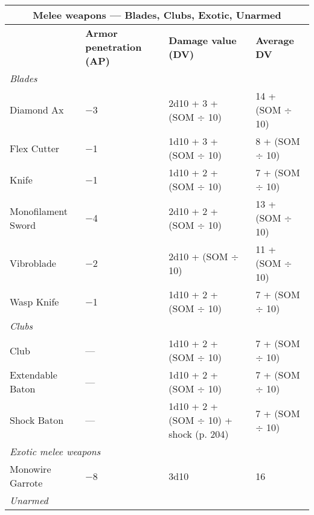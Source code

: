 \begin{table} \begin{tabularx}{\textwidth}{|l|X|l|l|} \hline

\multicolumn{4}{|c|}{\textbf{Melee weapons --- Blades, Clubs, Exotic, Unarmed}} \\ \hline

&\textbf{Armor penetration (AP)}	&\textbf{Damage value (DV)}	&\textbf{Average DV} \\ \hline

\multicolumn{4}{|l|}{\emph{Blades}} \\ \hline

Diamond Ax	&$-$3	&2d10 + 3 + (SOM $\div$ 10)	&14 + (SOM $\div$ 10) \\ \hline

Flex Cutter	&$-$1	&1d10 + 3 + (SOM $\div$ 10)	&8 + (SOM $\div$ 10) \\ \hline

Knife	&$-$1	&1d10 + 2 + (SOM $\div$ 10)	&7 + (SOM $\div$ 10) \\ \hline

Monofilament Sword	&$-$4	&2d10 + 2 + (SOM $\div$ 10)	&13 + (SOM $\div$ 10) \\ \hline

Vibroblade	&$-$2	&2d10 + (SOM $\div$ 10)	&11 + (SOM $\div$ 10) \\ \hline

Wasp Knife	&$-$1	&1d10 + 2 + (SOM $\div$ 10)	&7 + (SOM $\div$ 10) \\ \hline

\multicolumn{4}{|l|}{\emph{Clubs}} \\ \hline

Club	&--- &1d10 + 2 + (SOM $\div$ 10)	&7 + (SOM $\div$ 10) \\ \hline

Extendable Baton	&--- &1d10 + 2 + (SOM $\div$ 10)	&7 + (SOM $\div$ 10) \\ \hline

Shock Baton	&--- &1d10 + 2 + (SOM $\div$ 10) + shock (p. 204)	&7 + (SOM $\div$ 10) \\ \hline

\multicolumn{4}{|l|}{\emph{Exotic melee weapons}} \\ \hline

Monowire Garrote	&$-$8	&3d10	&16 \\ \hline

\multicolumn{4}{|l|}{\emph{Unarmed}} \\ \hline


\end{tabularx}
\end{table}
